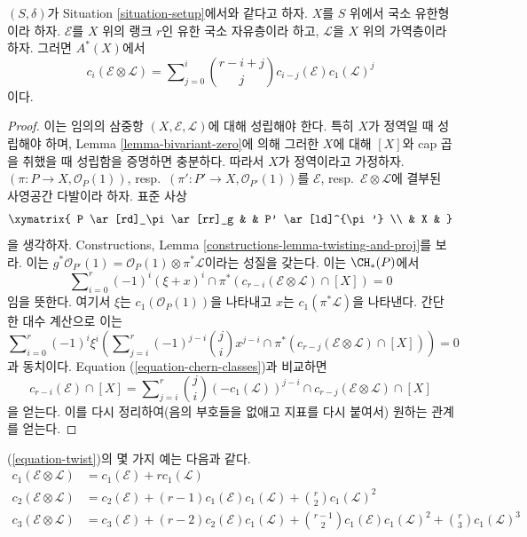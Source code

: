 \begin{lemma}
\label{lemma-chern-classes-E-tensor-L}
$(S, \delta)$가 Situation \ref{situation-setup}에서와 같다고 하자.
$X$를 $S$ 위에서 국소 유한형이라 하자. $\mathcal{E}$를 $X$ 위의
랭크 $r$인 유한 국소 자유층이라 하고, $\mathcal{L}$을 $X$ 위의
가역층이라 하자. 그러면 $A^*(X)$에서
\begin{equation}
\label{equation-twist}
c_i({\mathcal E} \otimes {\mathcal L})
=
\sum\nolimits_{j = 0}^i
\binom{r - i + j}{j} c_{i - j}({\mathcal E}) c_1({\mathcal L})^j
\end{equation}
이다.
\end{lemma}

\begin{proof}
이는 임의의 삼중항 $(X, \mathcal{E}, \mathcal{L})$에 대해 성립해야
한다. 특히 $X$가 정역일 때 성립해야 하며, Lemma
\ref{lemma-bivariant-zero}에 의해 그러한 $X$에 대해 $[X]$와 cap
곱을 취했을 때 성립함을 증명하면 충분하다. 따라서 $X$가 정역이라고
가정하자. $(\pi : P \to X, \mathcal{O}_P(1))$,
resp.\ $(\pi' : P' \to X, \mathcal{O}_{P'}(1))$를
$\mathcal{E}$, resp.\ $\mathcal{E} \otimes \mathcal{L}$에 결부된
사영공간 다발이라 하자. 표준 사상
$$
\xymatrix{
P \ar[rd]_\pi \ar[rr]_g & & P' \ar[ld]^{\pi'} \\
& X &
}
$$
을 생각하자. Constructions, Lemma
\ref{constructions-lemma-twisting-and-proj}를 보라. 이는
$g^*\mathcal{O}_{P'}(1)
= \mathcal{O}_P(1) \otimes \pi^* {\mathcal L}$이라는 성질을 갖는다.
이는 $\CH_*(P)$에서
$$
\sum\nolimits_{i = 0}^r
(-1)^i
(\xi + x)^i \cap \pi^*(c_{r - i}(\mathcal{E} \otimes \mathcal{L}) \cap [X])
=
0
$$
임을 뜻한다. 여기서 $\xi$는 $c_1(\mathcal{O}_P(1))$을 나타내고
$x$는 $c_1(\pi^*\mathcal{L})$을 나타낸다. 간단한 대수 계산으로 이는
$$
\sum\nolimits_{i = 0}^r
(-1)^i \xi^i \left(
\sum\nolimits_{j = i}^r
(-1)^{j - i}
\binom{j}{i}
x^{j - i} \cap
\pi^*(c_{r - j}(\mathcal{E} \otimes \mathcal{L}) \cap [X])
\right)
=
0
$$
과 동치이다. Equation (\ref{equation-chern-classes})과 비교하면
$$
c_{r - i}(\mathcal{E}) \cap [X] =
\sum\nolimits_{j = i}^r
\binom{j}{i}
(-c_1(\mathcal{L}))^{j - i} \cap
c_{r - j}(\mathcal{E} \otimes \mathcal{L}) \cap [X]
$$
을 얻는다. 이를 다시 정리하여(음의 부호들을 없애고 지표를 다시
붙여서) 원하는 관계를 얻는다.
\end{proof}

\noindent
(\ref{equation-twist})의 몇 가지 예는 다음과 같다.
\begin{align*}
c_1(\mathcal{E} \otimes \mathcal{L})
& =
c_1(\mathcal{E}) +
r c_1(\mathcal{L}) \\
c_2(\mathcal{E} \otimes \mathcal{L})
& =
c_2(\mathcal{E}) +
(r - 1) c_1(\mathcal{E}) c_1(\mathcal{L}) +
\binom{r}{2} c_1(\mathcal{L})^2 \\
c_3(\mathcal{E} \otimes \mathcal{L})
& =
c_3(\mathcal{E}) +
(r - 2) c_2(\mathcal{E})c_1(\mathcal{L}) +
\binom{r - 1}{2} c_1(\mathcal{E})c_1(\mathcal{L})^2 +
\binom{r}{3} c_1(\mathcal{L})^3
\end{align*}









